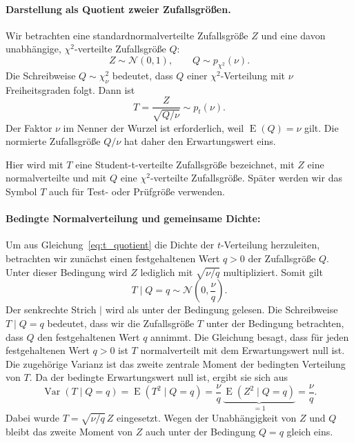 \paragraph{Darstellung als Quotient zweier Zufallsgrößen.}
Wir betrachten eine standardnormalverteilte Zufallsgröße $Z$ und eine davon
unabhängige, $\chi^2$-verteilte Zufallsgröße $Q$:
\begin{equation}
  Z\sim\mathcal N(0,1),
  \qquad Q\sim p_{\chi^2}(\nu).
  \label{eq:t_ausgangsgroessen}
\end{equation}
Die Schreibweise $Q\sim\chi^2_\nu$ bedeutet, dass $Q$ einer
$\chi^2$-Verteilung mit $\nu$ Freiheitsgraden folgt. Dann ist
\begin{equation}
  T=\frac{Z}{\sqrt{Q/\nu}}
  \sim p_t(\nu).
  \label{eq:t_quotient}
\end{equation}
Der Faktor $\nu$ im Nenner der Wurzel ist erforderlich, weil
$\operatorname{E}(Q)=\nu$ gilt. Die normierte Zufallsgröße $Q/\nu$
hat daher den Erwartungswert eins.

Hier wird mit $T$ eine Student-t-verteilte Zufallsgröße bezeichnet, mit $Z$ eine normalverteilte und mit $Q$ eine $\chi^2$-verteilte Zufallsgröße. Später werden wir das Symbol $T$ auch für Test- oder Prüfgröße verwenden.

\paragraph{Bedingte Normalverteilung und gemeinsame Dichte:}
Um aus Gleichung~\eqref{eq:t_quotient} die Dichte der $t$-Verteilung
herzuleiten, betrachten wir zunächst einen festgehaltenen Wert $q>0$
der Zufallsgröße $Q$. Unter dieser Bedingung wird $Z$ lediglich mit
$\sqrt{\nu/q}$ multipliziert. Somit gilt
\begin{equation}
  T\mid Q=q\sim\mathcal N\!\left(0,\frac{\nu}{q}\right).
  \label{eq:t_bedingte_normalverteilung}
\end{equation}
Der senkrechte Strich $\mid$ wird als \glqq unter der Bedingung\grqq{} gelesen.
Die Schreibweise $T\mid Q=q$ bedeutet, dass wir die Zufallsgröße $T$
unter der Bedingung betrachten, dass $Q$ den festgehaltenen Wert $q$
annimmt. Die Gleichung besagt, dass 
für jeden festgehaltenen Wert $q>0$ ist $T$ normalverteilt mit dem
Erwartungswert null ist.
Die zugehörige Varianz ist das zweite zentrale Moment der
bedingten Verteilung von $T$. Da der bedingte Erwartungswert
null ist, ergibt sie sich aus
\[
  \operatorname{Var}(T\mid Q=q)
  =\operatorname{E}(T^2\mid Q=q)
  =\frac{\nu}{q}\,
    \underbrace{\operatorname{E}(Z^2\mid Q=q)}_{=1}
  =\frac{\nu}{q}.
\]
Dabei wurde $T=\sqrt{\nu/q}\,Z$ eingesetzt. Wegen der
Unabhängigkeit von $Z$ und $Q$ bleibt das zweite Moment von $Z$
auch unter der Bedingung $Q=q$ gleich eins.

